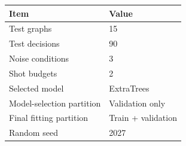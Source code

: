 \begin{tabular}{ll}
\toprule
Item & Value \\
\midrule
Test graphs & 15 \\
Test decisions & 90 \\
Noise conditions & 3 \\
Shot budgets & 2 \\
Selected model & ExtraTrees \\
Model-selection partition & Validation only \\
Final fitting partition & Train + validation \\
Random seed & 2027 \\
\bottomrule
\end{tabular}
